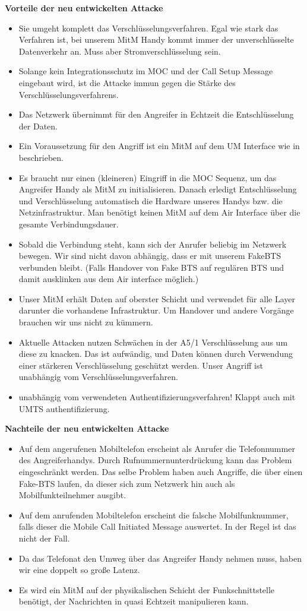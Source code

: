 \textbf{Vorteile der neu entwickelten Attacke}
\begin{itemize}
\item Sie umgeht komplett das Verschlüsselungsverfahren. Egal wie stark das Verfahren ist, bei unserem \ac{MitM} Handy kommt immer der unverschlüsselte Datenverkehr an. Muss aber Stromverschlüsselung sein.
\item Solange kein Integrationsschutz im \ac{MOC} und der Call Setup Message eingebaut wird, ist die Attacke immun gegen die Stärke des Verschlüsselungsverfahrens.
\item Das Netzwerk übernimmt für den Angreifer in Echtzeit die Entschlüsselung der Daten.
\item Ein Voraussetzung für den Angriff ist ein \ac{MitM} auf dem UM Interface wie in \citet{meyer2004man} beschrieben.
\item Es braucht nur einen (kleineren) Eingriff in die \ac{MOC} Sequenz, um das Angreifer Handy als \ac{MitM} zu initialisieren. Danach erledigt Entschlüsselung und Verschlüsselung automatisch die Hardware unseres Handys bzw. die Netzinfrastruktur. Man benötigt keinen \ac{MitM} auf dem Air Interface über die gesamte Verbindungsdauer.
\item Sobald die Verbindung steht, kann sich der  Anrufer beliebig im Netzwerk bewegen. Wir sind nicht davon abhängig, dass er mit unserem FakeBTS verbunden bleibt. (Falls Handover von Fake BTS auf regulären BTS und damit ausklinken aus dem Air interface möglich.)
\item Unser \ac{MitM} erhält Daten auf oberster Schicht und verwendet für alle Layer darunter die vorhandene Infrastruktur. Um Handover und andere Vorgänge brauchen wir uns nicht zu kümmern.
\item Aktuelle Attacken nutzen Schwächen in der A5/1 Verschlüsselung aus um diese zu knacken. Das ist aufwändig, und Daten können durch Verwendung einer stärkeren Verschlüsselung geschützt werden. Unser Angriff ist unabhängig vom Verschlüsselungsverfahren.
\item unabhängig vom verwendeten Authentifizierungsverfahren! Klappt auch mit UMTS authentifizierung.
\end{itemize}

\textbf{Nachteile der neu entwickelten Attacke}
\begin{itemize}
\item Auf dem angerufenen Mobiltelefon erscheint als Anrufer die Telefonnummer des Angreiferhandys. Durch Rufnummernunterdrückung kann das Problem eingeschränkt werden. Das selbe Problem haben auch Angriffe, die über einen Fake-BTS laufen, da dieser sich zum Netzwerk hin auch als Mobilfunkteilnehmer ausgibt. 
\item Auf dem anrufenden Mobiltelefon erscheint die falsche Mobilfunknummer, falls dieser die Mobile Call Initiated Message auswertet. In der Regel ist das nicht der Fall. 
\item Da das Telefonat den Umweg über das Angreifer Handy nehmen muss, haben wir eine doppelt so große Latenz.
\item Es wird ein \ac{MitM} auf der physikalischen Schicht der Funkschnittstelle benötigt, der Nachrichten in quasi Echtzeit manipulieren kann.
\end{itemize}